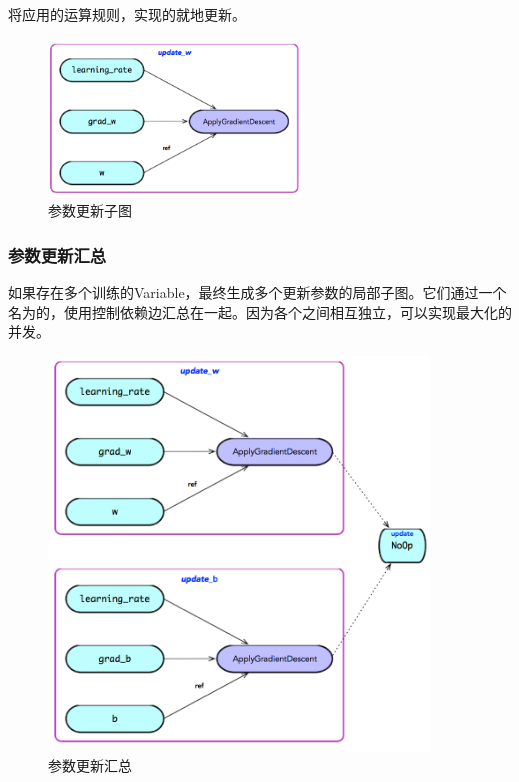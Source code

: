 \begin{content}
将应用的运算规则，实现的就地更新。

\begin{figure}[!h]
\centering
\includegraphics[width=0.6\textwidth]{figures/bp-update-w.png}
\caption{参数更新子图}
 \label{fig:bp-update-w}
\end{figure}

\subsubsection{参数更新汇总}

如果存在多个训练的Variable，最终生成多个更新参数的局部子图。它们通过一个名为的，使用控制依赖边汇总在一起。因为各个之间相互独立，可以实现最大化的并发。

\begin{figure}[!h]
\centering
\includegraphics[width=0.9\textwidth]{figures/bp-update-all-params.png}
\caption{参数更新汇总}
 \label{fig:bp-update-all-params}
\end{figure}


\end{content}
